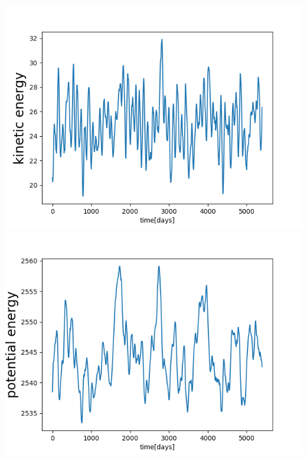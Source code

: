 \documentclass[handout]{beamer}
\begin{document}
\begin{frame}
\begin{columns}
\includegraphics[width=\textwidth]{./fig/L3/evol-0--EC.png}\\
\includegraphics[width=\textwidth]{./fig/L3/evol-0--EP.png}
\end{columns}


\end{frame}
\end{document}
